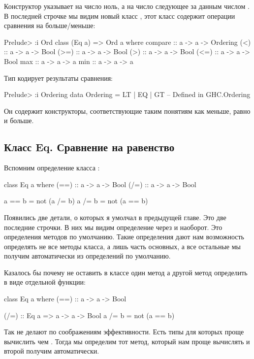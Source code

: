 Конструктор  указывает на число ноль, а  на число
следующее за данным числом . В последней строчке мы видим новый
класс , этот класс содержит операции сравнения на больше/меньше:


\begin{code}
Prelude> :i Ord
class (Eq a) => Ord a where
  compare :: a -> a -> Ordering
  (<) :: a -> a -> Bool
  (>=) :: a -> a -> Bool
  (>) :: a -> a -> Bool
  (<=) :: a -> a -> Bool
  max :: a -> a -> a
  min :: a -> a -> a
\end{code}

Тип  кодирует результаты сравнения:


\begin{code}
Prelude> :i Ordering
data Ordering = LT | EQ | GT 	-- Defined in GHC.Ordering
\end{code}

Он содержит конструкторы, соответствующие таким понятиям как меньше,
равно и больше.

\subsection{Класс Eq. Сравнение на равенство}

Вспомним определение класса :


\begin{code}
class Eq a where
    (==) :: a -> a -> Bool
    (/=) :: a -> a -> Bool

    a == b = not (a /= b)
    a /= b = not (a == b)
\end{code}

Появились две детали, о которых я умолчал в предыдущей главе. Это две
последние строчки. В них мы видим определение \In{==} через \In{/=} и
наоборот. Это определения методов по умолчанию. Такие определения дают
нам возможность определять не все методы класса, а лишь часть основных,
а все остальные мы получим автоматически из определений по умолчанию.

Казалось бы почему не оставить в классе  один метод а другой
метод определить в виде отдельной функции:


\begin{code}
class Eq a where
    (==) :: a -> a -> Bool

(/=) :: Eq a => a -> a -> Bool
a /= b = not (a == b)
\end{code}

Так не делают по соображениям эффективности. Есть типы для которых проще
вычислить \In{/=} чем \In{==}. Тогда мы определим тот метод, который нам
проще вычислять и второй получим автоматически.

